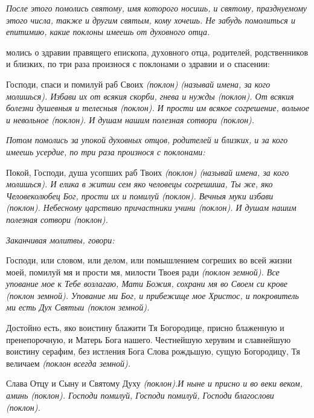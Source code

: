 \itshape После этого помолись святому, имя которого носишь, и святому, празднуемому этого числа, также и другим святым, кому хочешь. Не забудь помолиться и епитимию, какие поклоны имеешь от духовного отца.\normalfont{}


 молись о здравии правящего епископа, духовного отца, родителей, родственников и близких, по три раза произнося с поклонами о здравии и о спасении: 


 Господи, спаси и помилуй раб Своих \itshape (поклон) (называй имена, за кого молишься)\normalfont{}. Избави их от всякия скорби, гнева и нужды \itshape (поклон)\normalfont{}. От всякия болезни душевныя и телесныя \itshape (поклон)\normalfont{}. И прости им всякое согрешение, вольное и невольное (поклон). И душам нашим полезная сотвори \itshape (поклон)\normalfont{}. 


\medskip\itshape Потом помолись за упокой духовных отцов, родителей и близких, и за кого имеешь усердие, по три раза произнося с поклонами: \normalfont{}


Покой, Господи, душа усопших раб Твоих \itshape (поклон) (называй имена, за кого молишься)\normalfont{}. И елика в житии сем яко человецы согрешиша, Ты же, яко Человеколюбец Бог, прости их и помилуй (поклон). Вечныя муки избави \itshape (поклон)\normalfont{}. Небесному царствию причастники учини \itshape (поклон)\normalfont{}. И душам нашим полезная сотвори \itshape (поклон)\normalfont{}.


\medskip\itshape Заканчивая молитвы, говори: \normalfont{}


Господи, или словом, или делом, или помышлением согреших во всей жизни моей, помилуй мя и прости мя, милости Твоея ради \itshape (поклон земной)\normalfont{}. Все упование мое к Тебе возлагаю, Мати Божия, сохрани мя во Своем си крове \itshape (поклон земной)\normalfont{}. Упование ми Бог, и прибежище мое Христос, и покровитель ми есть Дух Святыи \itshape (поклон земной)\normalfont{}.


Достойно есть, яко воистину блажити Тя Богородице, присно блаженную и пренепорочную, и Матерь Бога нашего. Честнейшую херувим и славнейшую воистину серафим, без истления Бога Слова рождьшую, сущую Богородицу, Тя величаем \itshape (поклон всегда земной)\normalfont{}.


Слава Отцу и Сыну и Святому Духу \itshape (поклон)\normalfont{}.И ныне и присно и во веки веком, аминь \itshape (поклон)\normalfont{}. Господи помилуй, Господи помилуй, Господи благослови \itshape (поклон)\normalfont{}. 


